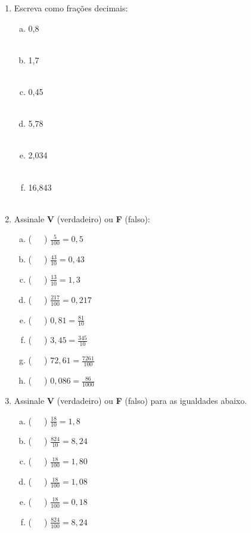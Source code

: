 \documentclass[a4paper,14pt]{article}
\begin{document}
\begin{multicols}{2}
\begin{enumerate}
\begin{enumerate}[a)]
			\end{enumerate}
			\item Escreva como frações decimais:
			\begin{enumerate}[a)]
				\item 0,8 \\\\
				\item 1,7 \\\\
				\item 0,45 \\\\
				\item 5,78 \\\\
				\item 2,034 \\\\
				\item 16,843 \\\\
			\end{enumerate}
			\item Assinale \textbf{V} (verdadeiro) ou \textbf{F} (falso):
			\begin{enumerate}[a)]
				\item (~~~) $\frac{5}{100} = 0,5$
				\item (~~~) $\frac{43}{10} = 0,43$
				\item (~~~) $\frac{13}{10} = 1,3$
				\item (~~~) $\frac{217}{100} = 0,217$
				\item (~~~) $0,81 = \frac{81}{10}$
				\item (~~~) $3,45 = \frac{345}{10}$
				\item (~~~) $72,61 = \frac{7261}{100}$
				\item (~~~) $0,086 = \frac{86}{1000}$
			\end{enumerate}
		    \item Assinale \textbf{V} (verdadeiro) ou \textbf{F} (falso) para as igualdades abaixo.
		    \begin{enumerate}[a)]
		    	\item (~~~) $\frac{18}{10} = 1,8$
		    	\item (~~~) $\frac{824}{10} = 8,24$
		    	\item (~~~) $\frac{18}{100} = 1,80$
		    	\item (~~~) $\frac{18}{100} = 1,08$
		    	\item (~~~) $\frac{18}{100} = 0,18$
		    	\item (~~~) $\frac{824}{100} = 8,24$

\end{enumerate}
\end{enumerate}
\end{multicols}
\end{document}
